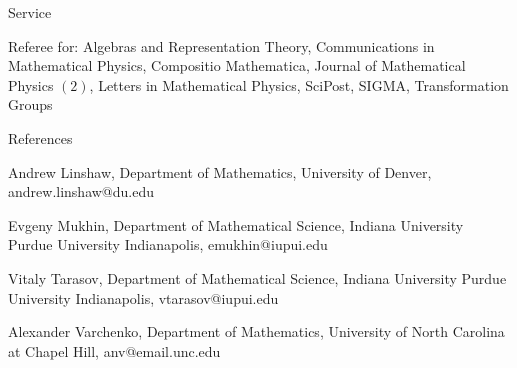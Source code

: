 \documentclass{resume} %
\begin{document}
\begin{rSection}{Service}
\begin{rSubsection}{}{}
{}{}
\item Referee for: Algebras and Representation Theory, Communications in Mathematical Physics, Compositio Mathematica, Journal of Mathematical Physics $(2)$, Letters in Mathematical Physics, SciPost, SIGMA, Transformation Groups \\ 	
\end{rSubsection}
\end{rSection}

\begin{rSection}{References}
\begin{rSubsection}{}{}
{}{}
  \item {Andrew Linshaw, Department of Mathematics, University of Denver, andrew.linshaw@du.edu}\\
  \item {Evgeny Mukhin, Department of Mathematical Science, Indiana University Purdue University Indianapolis, emukhin@iupui.edu}\\
  \item {Vitaly Tarasov, Department of Mathematical Science, Indiana University Purdue University Indianapolis, vtarasov@iupui.edu}\\
  \item {Alexander Varchenko, Department of Mathematics, University of North Carolina at Chapel Hill, anv@email.unc.edu}\\

\end{rSubsection}
\end{rSection}
\end{document}
